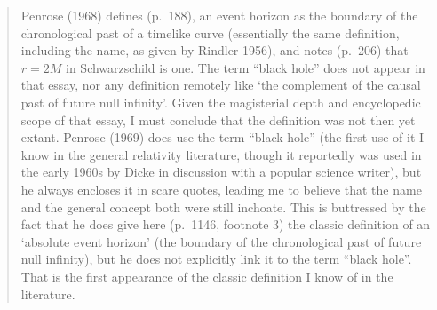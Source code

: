 \documentclass[11pt,a4paper]{article}
\begin{document}
\begin{quote}
\begin{small}
Penrose (1968) defines (p.\ 188), an event horizon as the boundary of the chronological past of
a timelike curve (essentially the same definition, including the name, as given by Rindler 1956),
and notes (p.\ 206) that $r = 2M$ in Schwarzschild is one. The term ``black hole'' does not appear
in that essay, nor any definition remotely like `the complement of the causal past of future null
infinity'. Given the magisterial depth and encyclopedic scope of that essay, I must conclude that
the definition was not then yet extant. Penrose (1969) does use the term ``black hole'' (the first use
of it I know in the general relativity literature, though it reportedly was used in the early 1960s by
Dicke in discussion with a popular science writer), but he always encloses it in scare quotes, leading
me to believe that the name and the general concept both were still inchoate. This is buttressed
by the fact that he does give here (p.\ 1146, footnote 3) the classic definition of an `absolute event
horizon' (the boundary of the chronological past of future null infinity), but he does not explicitly
link it to the term ``black hole''. That is the first appearance of the classic definition I know of in
the literature.


\end{small}
\end{quote}
\end{document}
